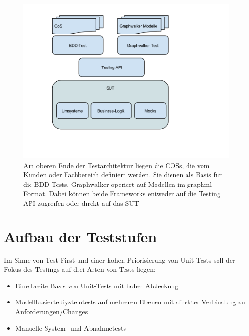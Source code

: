 \begin{figure}[h] 
  \centering
     \includegraphics[width=1.0\textwidth]{figures/Testarchitektur-MBT-BDD-COS.png}
  \caption{Am oberen Ende der Testarchitektur liegen die \glspl{COS}, die vom Kunden oder Fachbereich definiert werden. Sie dienen als Basis für die BDD-Tests. Graphwalker operiert auf Modellen im graphml-Format. Dabei können beide Frameworks entweder auf die Testing API zugreifen oder direkt auf das SUT.}
  \label{fig:testarchitektur}
\end{figure}

\section{Aufbau der Teststufen}
Im Sinne von Test-First und einer hohen Priorisierung von Unit-Tests soll der Fokus des Testings auf drei Arten von Tests liegen:

\begin{itemize}
\item Eine breite Basis von Unit-Tests mit hoher Abdeckung
\item Modellbasierte Systemtests auf mehreren Ebenen mit direkter Verbindung zu Anforderungen/Changes
\item Manuelle System- und Abnahmetests
\end{itemize}


